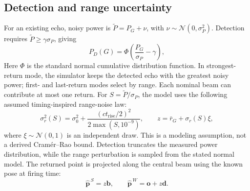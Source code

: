 \documentclass[11pt,letterpaper]{article}
\newcommand{\vect}[1]{\mathbf #1}
\begin{document}
\subsection{Detection and range uncertainty}
For an existing echo, noisy power is $\widetilde P=P_G+\nu$, with $\nu\sim\mathcal N(0,\sigma_P^2)$. Detection requires $\widetilde P\geq\gamma\sigma_P$, giving
\begin{equation}\label{eq:detection}
P_D(G)=\Phi\!\left(\frac{P_G}{\sigma_P}-\gamma\right),
\end{equation}
Here $\Phi$ is the standard normal cumulative distribution function. In strongest-return mode, the simulator keeps the detected echo with the greatest noisy power; first- and last-return modes select by range. Each nominal beam can contribute at most one return. For $S=\widetilde P/\sigma_P$, the model uses the following assumed timing-inspired range-noise law:
\begin{equation}\label{eq:range}
\sigma_r^2(S)=\sigma_0^2+\frac{(ct_{\mathrm{rise}}/2)^2}{2\max(S,10^{-9})},\qquad z=\bar r_G+\sigma_r(S)\xi,
\end{equation}
where $\xi\sim\mathcal N(0,1)$ is an independent draw. This is a modeling assumption, not a derived Cram\'er--Rao bound. Detection truncates the measured power distribution, while the range perturbation is sampled from the stated normal model. The returned point is projected along the central beam using the known pose at firing time:
\begin{equation}\label{eq:coordinates}
\widehat{\vect p}^{\,S}=z\vect b,\qquad \widehat{\vect p}^{\,W}=\vect o+z\vect d.
\end{equation}
\end{document}
